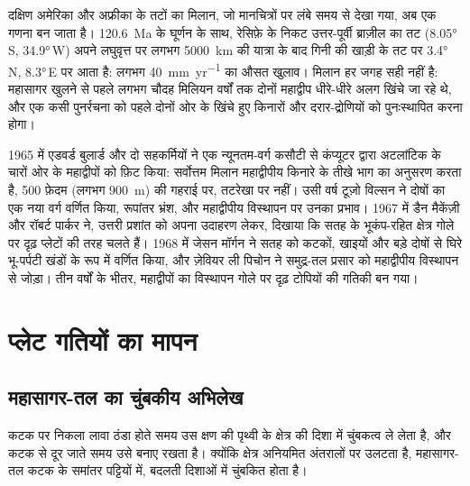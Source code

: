 दक्षिण अमेरिका और अफ्रीका के तटों का मिलान, जो मानचित्रों पर लंबे समय से देखा गया, अब एक गणना बन जाता है। \qty{120.6}{Ma} के घूर्णन के साथ, रेसिफ़े के निकट उत्तर-पूर्वी ब्राज़ील का तट (\ang{8.05}\,S, \ang{34.9}\,W) अपने लघुवृत्त पर लगभग \qty{5000}{km} की यात्रा के बाद गिनी की खाड़ी के तट पर \ang{3.4}\,N, \ang{8.3}\,E पर आता है: लगभग \qty{40}{mm.yr^{-1}} का औसत खुलाव। मिलान हर जगह सही नहीं है: महासागर खुलने से पहले लगभग चौदह मिलियन वर्षों तक दोनों महाद्वीप धीरे-धीरे अलग खिंचे जा रहे थे, और एक कसी पुनर्रचना को पहले दोनों ओर के खिंचे हुए किनारों और दरार-द्रोणियों को पुनःस्थापित करना होगा।

\begin{history}[गोले पर विवर्तनिकी]
1965 में एडवर्ड बुलार्ड और दो सहकर्मियों ने एक न्यूनतम-वर्ग कसौटी से कंप्यूटर द्वारा अटलांटिक के चारों ओर के महाद्वीपों को फ़िट किया: सर्वोत्तम मिलान महाद्वीपीय किनारे के तीखे भाग का अनुसरण करता है, 500 फ़ेदम (लगभग \qty{900}{m}) की गहराई पर, तटरेखा पर नहीं। उसी वर्ष टूज़ो विल्सन ने दोषों का एक नया वर्ग वर्णित किया, रूपांतर भ्रंश, और महाद्वीपीय विस्थापन पर उनका प्रभाव। 1967 में डैन मैकेंज़ी और रॉबर्ट पार्कर ने, उत्तरी प्रशांत को अपना उदाहरण लेकर, दिखाया कि सतह के भूकंप-रहित क्षेत्र गोले पर दृढ़ प्लेटों की तरह चलते हैं। 1968 में जेसन मॉर्गन ने सतह को कटकों, खाइयों और बड़े दोषों से घिरे भू-पर्पटी खंडों के रूप में वर्णित किया, और ज़ेवियर ली पिचोन ने समुद्र-तल प्रसार को महाद्वीपीय विस्थापन से जोड़ा। तीन वर्षों के भीतर, महाद्वीपों का विस्थापन गोले पर दृढ़ टोपियों की गतिकी बन गया।
\end{history}

\section{प्लेट गतियों का मापन}

\subsection*{महासागर-तल का चुंबकीय अभिलेख}

कटक पर निकला लावा ठंडा होते समय उस क्षण की पृथ्वी के क्षेत्र की दिशा में चुंबकत्व ले लेता है, और कटक से दूर जाते समय उसे बनाए रखता है। क्योंकि क्षेत्र अनियमित अंतरालों पर उलटता है, महासागर-तल कटक के समांतर पट्टियों में, बदलती दिशाओं में चुंबकित होता है।

